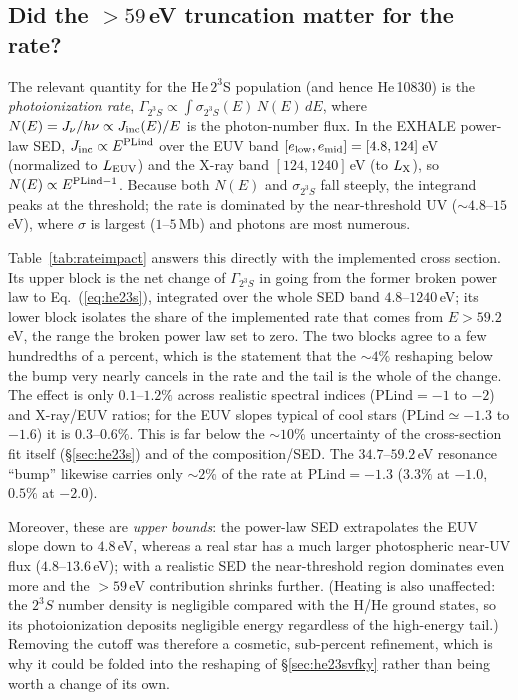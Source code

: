 \documentclass[english,a4paper]{my_memo}
\newcommand{\Mb}{\mathrm{Mb}}
\newcommand{\sig}{\sigma}
\begin{document}
\subsection{Did the $>59\,$eV truncation matter for the rate?}
\label{sec:rateimpact}

The relevant quantity for the He\,$2^3$S population (and hence He\,10830)
is the \emph{photoionization rate},
$\Gamma_{2^3S} \propto \int \sig_{2^3S}(E)\,N(E)\,dE$, where
$N(E)=J_\nu/h\nu \propto J_{\rm inc}(E)/E$ is the photon-number flux.
In the EXHALE power-law SED, $J_{\rm inc}\propto E^{\rm PLind}$ over the
EUV band $[e_{\rm low},e_{\rm mid}]=[4.8,124]\,$eV (normalized to
$L_{\rm EUV}$) and the X-ray band $[124,1240]\,$eV (to $L_{\rm X}$), so
$N(E)\propto E^{\rm PLind-1}$. Because both $N(E)$ and $\sig_{2^3S}$ fall
steeply, the integrand peaks at the threshold; the rate is dominated by
the near-threshold UV ($\sim$$4.8$--$15\,$eV), where $\sig$ is largest
($1$--$5\,\Mb$) and photons are most numerous.

Table~\ref{tab:rateimpact} answers this directly with the implemented cross
section. Its upper block is the net change of $\Gamma_{2^3S}$ in going from the
former broken power law to Eq.~(\ref{eq:he23s}), integrated over the whole SED
band $4.8$--$1240\,$eV; its lower block isolates the share of the implemented
rate that comes from $E>59.2\,$eV, the range the broken power law set to zero.
The two blocks agree to a few hundredths of a percent, which is the statement
that the $\sim$$4\%$ reshaping below the bump very nearly cancels in the rate
and the tail is the whole of the change. The effect is only $0.1$--$1.2\%$
across realistic spectral indices ($\mathrm{PLind}=-1$ to $-2$) and X-ray/EUV
ratios; for the EUV slopes typical of cool stars
($\mathrm{PLind}\simeq-1.3$ to $-1.6$) it is $0.3$--$0.6\%$. This is far
below the $\sim$$10\%$ uncertainty of the cross-section fit itself
(\S\ref{sec:he23s}) and of the composition/SED. The $34.7$--$59.2\,$eV
resonance ``bump'' likewise carries only $\sim$$2\%$ of the rate at
$\mathrm{PLind}=-1.3$ ($3.3\%$ at $-1.0$, $0.5\%$ at $-2.0$).

Moreover, these are \emph{upper bounds}: the power-law SED extrapolates
the EUV slope down to $4.8\,$eV, whereas a real star has a much larger
photospheric near-UV flux ($4.8$--$13.6\,$eV); with a realistic SED the
near-threshold region dominates even more and the $>59\,$eV contribution
shrinks further. (Heating is also unaffected: the $2^3S$ number density
is negligible compared with the H/He ground states, so its
photoionization deposits negligible energy regardless of the high-energy
tail.) Removing the cutoff was therefore a cosmetic, sub-percent refinement, which is
why it could be folded into the reshaping of \S\ref{sec:he23svfky} rather than
being worth a change of its own.
\end{document}
